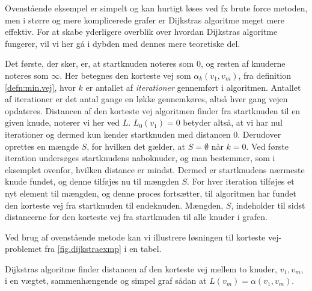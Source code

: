 Ovenstående eksempel er simpelt og kan hurtigt løses ved fx brute force metoden, men i større og mere komplicerede grafer er Dijkstras algoritme meget mere effektiv. For at skabe yderligere overblik over hvordan Dijkstras algoritme fungerer, vil vi her gå i dybden med dennes mere teoretiske del.

Det første, der sker, er, at startknuden noteres som $0$, og resten af knuderne noteres som $\infty$. Her betegnes den korteste vej som $\alpha_{k}(v_1,v_m)$, fra definition \ref{defn:min.vej}, hvor $k$ er antallet af \emph{iterationer} gennemført i algoritmen. Antallet af iterationer er det antal gange en løkke gennemkøres, altså hver gang vejen opdateres. Distancen af den korteste vej algoritmen finder fra startknuden til en given knude, noterer vi her ved $L$. $L_{0}(v_1)=0$ betyder altså, at vi har nul iterationer og dermed kun kender startknuden med distancen $0$. Derudover oprettes en mængde $S$, for hvilken det gælder, at $S = \emptyset$ når $k = 0$. Ved første iteration undersøges startknudens naboknuder, og man bestemmer, som i eksemplet ovenfor, hvilken distance er mindst. Dermed er startknudens nærmeste knude fundet, og denne tilføjes nu til mængden $S$. For hver iteration tilføjes et nyt element til mængden, og denne proces fortsætter, til algoritmen har fundet den korteste vej fra startknuden til endeknuden. Mængden, $S$, indeholder til sidst distancerne for den korteste vej fra startknuden til alle knuder i grafen. 

Ved brug af ovenstående metode kan vi illustrere løsningen til korteste vej-problemet fra \autoref{fig.dijkstraexmp} i en tabel.



\begin{thm} \label{thm:dijkstra}
Dijkstras algoritme finder distancen af den korteste vej mellem to knuder, $v_1,v_m$, i en vægtet, sammenhængende og simpel graf sådan at $L(v_m)=\alpha(v_1,v_m)$. 
\end{thm}

